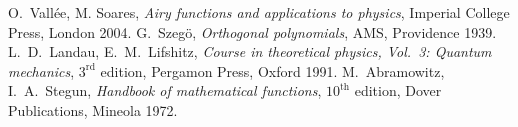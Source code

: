 \documentclass[slovene,11pt,a4paper]{article}
\begin{document}
\begin{thebibliography}{99}
\setlength{\itemsep}{.2\itemsep}\setlength{\parsep}{.5\parsep}
 O.~Vall\'ee, M. Soares,
  {\sl Airy functions and applications to physics},
  Imperial College Press, London 2004.
 G.~Szeg\"o, {\sl Orthogonal polynomials},
  AMS, Providence 1939.
 L.~D.~Landau, E.~M.~Lifshitz, {\sl Course in
  theoretical physics, Vol.~3: Quantum mechanics},
  $3^\mathrm{rd}$ edition, Pergamon Press, Oxford 1991.
 M.~Abramowitz, I.~A.~Stegun, {\sl Handbook of mathematical
  functions}, $10^\mathrm{th}$ edition, Dover Publications, Mineola 1972.
\end{thebibliography}


\bigskip
\end{document}
